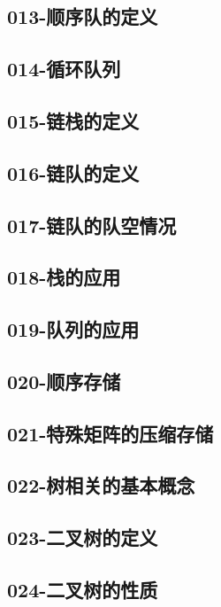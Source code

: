 \subsection{013-顺序队的定义}

\subsection{014-循环队列}

\subsection{015-链栈的定义}

\subsection{016-链队的定义}

\subsection{017-链队的队空情况}

\subsection{018-栈的应用}

\subsection{019-队列的应用}

\subsection{020-顺序存储}

\subsection{021-特殊矩阵的压缩存储}

\subsection{022-树相关的基本概念}

\subsection{023-二叉树的定义}

\subsection{024-二叉树的性质}

